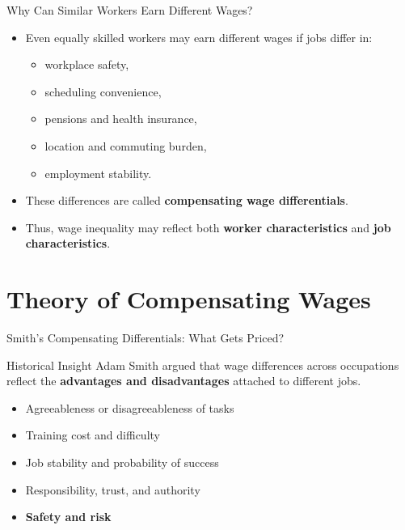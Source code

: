 \documentclass[aspectratio=169]{beamer}
\begin{document}
\begin{frame}{Why Can Similar Workers Earn Different Wages?}
\transfade
\begin{itemize}
  \item Even equally skilled workers may earn different wages if jobs differ in:
  \begin{itemize}
    \item workplace safety,
    \item scheduling convenience,
    \item pensions and health insurance,
    \item location and commuting burden,
    \item employment stability.
  \end{itemize}
  \item These differences are called \textbf{compensating wage differentials}.
  \item Thus, wage inequality may reflect both \textbf{worker characteristics} and \textbf{job characteristics}.
\end{itemize}
\end{frame}

\section{Theory of Compensating Wages}

\begin{frame}{Smith's Compensating Differentials: What Gets Priced?}
\transfade
\begin{block}{Historical Insight}
Adam Smith argued that wage differences across occupations reflect the \textbf{advantages and disadvantages} attached to different jobs.
\end{block}
\begin{itemize}
  \item Agreeableness or disagreeableness of tasks
  \item Training cost and difficulty
  \item Job stability and probability of success
  \item Responsibility, trust, and authority
  \item \textbf{Safety and risk}
\end{itemize}
\end{frame}
\end{document}
